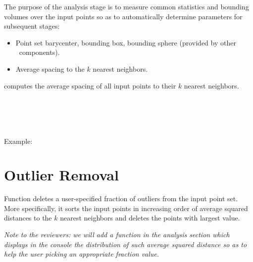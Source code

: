 The purpose of the analysis stage is to measure common statistics and bounding volumes over the input points so as to automatically determine parameters for subsequent stages:
\begin{itemize}
  \item Point set barycenter, bounding box,
        bounding sphere (provided by other \cgal\ components).
  \item Average spacing to the $k$ nearest neighbors.
\end{itemize}

 computes the average spacing of all input points to their $k$ nearest neighbors.

  \\
  \\
  \\
  \\

Example:



\section{Outlier Removal}

Function  deletes a user-specified fraction of outliers from the input point set. More specifically, it sorts the input points in increasing order of average squared distances to the $k$ nearest neighbors and deletes the points with largest value.

\emph{Note to the reviewers: we will add a function in the analysis section which displays in the console the distribution of such average squared distance so as to help the user picking an appropriate fraction value.}

  \\


